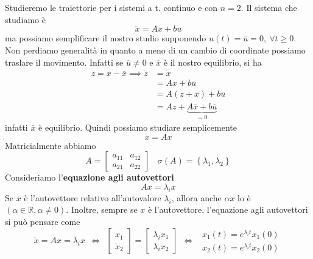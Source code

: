 Studieremo le traiettorie per i sistemi a t. continuo e con $n=2$. Il sistema che studiamo è
\begin{equation*}
	\dot{x} =Ax+bu
\end{equation*}
ma possiamo semplificare il nostro studio supponendo $u\left(t\right) =\overline{u} =0,\ \forall t\geq 0$. Non perdiamo generalità in quanto a meno di un cambio di coordinate possiamo traslare il movimento. Infatti se $\overline{u} \neq 0$ e $\overline{x}$ è il nostro equilibrio, si ha
\begin{equation*}
	\begin{aligned}
		z=x-\overline{x} \implies \dot{z} & =\dot{x}                                           \\
		                                     & =Ax+b\overline{u}                                  \\
		                                     & =A\left(z+\overline{x}\right) +b\overline{u}       \\
		                                     & =Az+\underbrace{A\overline{x} +b\overline{u}}_{=0} 
	\end{aligned}
\end{equation*}
infatti $\overline{x}$ è equilibrio. Quindi possiamo studiare semplicemente
\begin{equation*}
	\dot{x} =Ax
\end{equation*}
Matricialmente abbiamo
\begin{equation*}
	A=\begin{bmatrix}
	a_{11} & a_{12}\\
	a_{21} & a_{22}
	\end{bmatrix} \ \ \ \ \sigma \left(A\right) =\left\{\lambda _1 ,\lambda _2\right\}
\end{equation*}
Consideriamo l'\textbf{equazione agli autovettori}
\begin{equation*}
	\boxed{Ax=\lambda _i x}
\end{equation*}
Se $x$ è l'autovettore relativo all'autovalore $\lambda _i$, allora anche $\alpha x$ lo è $\left(\alpha \in \mathbb{R} ,\alpha \neq 0\right)$. Inoltre, sempre se $x$ è l'autovettore, l'equazione agli autovettori si può pensare come
\begin{equation*}
	\dot{x} =Ax=\lambda _i x\ \ \iff \ \ \begin{bmatrix}
	\dot{x}_1\\
	\dot{x}_2
	\end{bmatrix} =\begin{bmatrix}
	\lambda _i x_1\\
	\lambda _i x_2
	\end{bmatrix} \ \ \iff \ \ \begin{array}{ c }
	x_1\left(t\right) =e^{\lambda _i t} x_1\left(0\right)\\
	x_2\left(t\right) =e^{\lambda _i t} x_2\left(0\right)
	\end{array}
\end{equation*}
